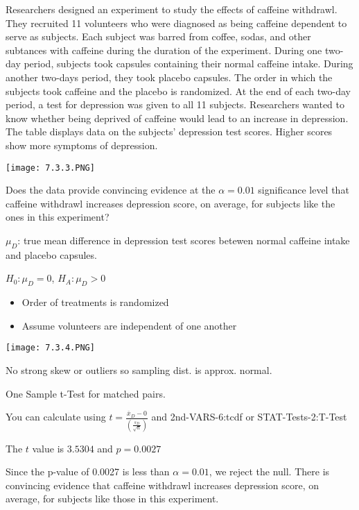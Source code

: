\documentclass[../stats.tex]{subfiles}
\begin{document}
\begin{example}
    Researchers designed an experiment to study the effects of caffeine withdrawl. They recruited 11 volunteers who were diagnosed as being caffeine dependent to serve as subjects. Each subject was barred from coffee, sodas, and other subtances 
    with caffeine during the duration of the experiment. During one two-day period, subjects took capsules containing their normal caffeine intake. During another two-days period, they took placebo capsules. The order in which the subjects took caffeine and the placebo is randomized.
    At the end of each two-day period, a test for depression was given to all 11 subjects. Researchers wanted to know whether being deprived of caffeine would lead to an increase in depression. The table displays data on the subjects' depression test scores. Higher scores show more symptoms of depression.

    \begin{center}
        \texttt{[image: 7.3.3.PNG]}
    \end{center}

    Does the data provide convincing evidence at the $\alpha=0.01$ significance level that caffeine withdrawl increases depression score, on average, for subjects like the ones in this experiment?

    $\mu_D$: true mean difference in depression test scores betewen normal caffeine intake and placebo capsules.

    $H_0: \mu_D = 0$, $H_A: \mu_D>0$

    \begin{itemize}
        \item Order of treatments is randomized 
        \item Assume volunteers are independent of one another 
    \end{itemize}
    \begin{center}
        \texttt{[image: 7.3.4.PNG]}
    \end{center}
    No strong skew or outliers so sampling dist. is approx. normal.

    One Sample t-Test for matched pairs.

    You can calculate using $t=\frac{\overline{x}_D-0}{\left(\frac{s_D}{\sqrt{n}}\right)}$ and 2nd-VARS-6:tcdf or STAT-Tests-2:T-Test 

    The $t$ value is $3.5304$ and $p=0.0027$

    Since the p-value of 0.0027 is less than $\alpha=0.01$, we reject the null. There is convincing evidence that caffeine withdrawl increases depression score, on average, for subjects like those in this experiment.
\end{example}
\end{document}
